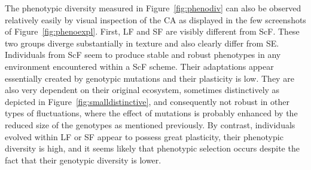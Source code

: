 The phenotypic diversity measured in Figure~\ref{fig:phenodiv} can also be observed relatively easily by visual inspection of the CA as displayed in the few screenshots of Figure~\ref{fig:phenoexpl}. First, LF and SF are visibly different from ScF. These two groups diverge substantially in texture and also clearly differ from SE. Individuals from ScF seem to produce stable and robust phenotypes in any environment encountered within a ScF scheme. Their adaptations appear essentially created by genotypic mutations and their plasticity is low. They are also very dependent on their original ecosystem, sometimes distinctively as depicted in Figure~\ref{fig:smalldistinctive}, and consequently not robust in other types of fluctuations, where the effect of mutations is probably enhanced by the reduced size of the genotypes as mentioned previously. By contrast, individuals evolved within LF or SF appear to possess great plasticity, their phenotypic diversity is high, and it seems likely that phenotypic selection occurs despite the fact that their genotypic diversity is lower.

